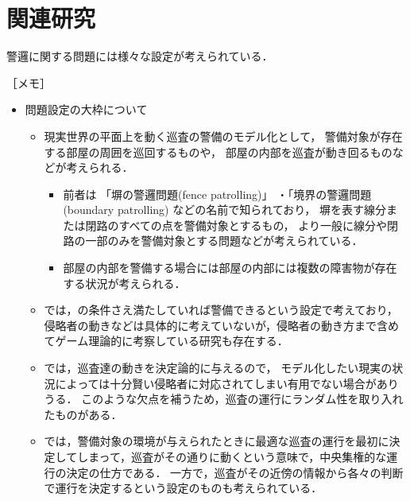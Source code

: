 \section*{関連研究}

警邏に関する問題には様々な設定が考えられている．

［メモ］
\begin{itemize}

  \item 問題設定の大枠について
  \begin{itemize}
    \item 現実世界の平面上を動く巡査の警備のモデル化として，
      警備対象が存在する部屋の周囲を巡回するものや，
      部屋の内部を巡査が動き回るものなどが考えられる．
    \begin{itemize}
      \item 
        前者は
        「塀の警邏問題(fence patrolling)」
        ・「境界の警邏問題(boundary patrolling)
        などの名前で知られており，
        塀を表す線分または閉路のすべての点を警備対象とするもの\cite{czyzowicz2011boundary, dumitrescu2014fence, kawamura2015fence}，
        より一般に線分や閉路の一部のみを警備対象とする問題などが考えられている\cite{collins2013optimal}．
      \item 
        部屋の内部を警備する場合には部屋の内部には複数の障害物が存在する状況が考えられる\cite{}．
        
    \end{itemize}
    \item {\patProb}では，{\maxIdletime}の条件さえ満たしていれば警備できるという設定で考えており，侵略者の動きなどは具体的に考えていないが，侵略者の動き方まで含めてゲーム理論的に考察している研究も存在する\cite{brazdil2015strategy, papadaki2016patrolling}．
    \item {\patProb}では，巡査達の動きを決定論的に与えるので，
    モデル化したい現実の状況によっては十分賢い侵略者に対応されてしまい有用でない場合がありうる．
    このような欠点を補うため，巡査の運行にランダム性を取り入れたものがある\cite{}．
    \item {\patProb}では，警備対象の環境が与えられたときに最適な巡査の運行を最初に決定してしまって，巡査がその通りに動くという意味で，中央集権的な運行の決定の仕方である．
    一方で，巡査がその近傍の情報から各々の判断で運行を決定するという設定のものも考えられている\cite{}．
  \end{itemize}


\end{itemize}
